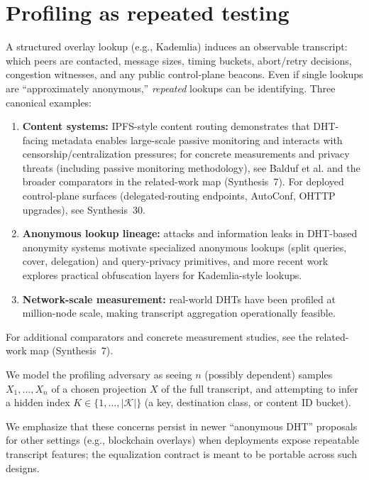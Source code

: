 \documentclass[11pt]{article}
\begin{document}
\section{Profiling as repeated testing}
A structured overlay lookup (e.g., Kademlia\cite{kademlia}) induces an observable transcript: which peers are contacted, message sizes, timing buckets, abort/retry decisions, congestion witnesses, and any public control-plane beacons.
Even if single lookups are ``approximately anonymous,'' \emph{repeated} lookups can be identifying.
Three canonical examples:
\begin{enumerate}[leftmargin=*]
\item \textbf{Content systems:} IPFS-style content routing demonstrates that DHT-facing metadata enables large-scale passive monitoring and interacts with censorship/centralization pressures; for concrete measurements and privacy threats (including passive monitoring methodology), see Balduf et al.\cite{baldufIPFSMonitoring2022} and the broader comparators in the related-work map (Synthesis~7).\cite{trautweinIPFS2022,series:relatedworkmap} For deployed control-plane surfaces (delegated-routing endpoints, AutoConf, OHTTP upgrades), see Synthesis~30.\cite{series:deployedsurfaces}
\item \textbf{Anonymous lookup lineage:} attacks and information leaks in DHT-based anonymity systems motivate specialized anonymous lookups (split queries, cover, delegation) and query-privacy primitives, and more recent work explores practical obfuscation layers for Kademlia-style lookups.\cite{wangborisovLookupCCS2010,mittal_tissec,octopus,backesQueryPrivacy2012,danielQueryObfuscationSAC2025}
\item \textbf{Network-scale measurement:} real-world DHTs have been profiled at million-node scale, making transcript aggregation operationally feasible.\cite{falknerMillionDHT2007}
\end{enumerate}

For additional comparators and concrete measurement studies, see the related-work map (Synthesis~7).\cite{series:relatedworkmap}

We model the profiling adversary as seeing $n$ (possibly dependent) samples $X_1,\dots,X_n$ of a chosen projection $X$ of the full transcript, and attempting to infer a hidden index $K\in\{1,\dots,|\mathcal K|\}$ (a key, destination class, or content ID bucket).

We emphasize that these concerns persist in newer ``anonymous DHT'' proposals for other settings (e.g., blockchain overlays) when deployments expose repeatable transcript features; the equalization contract is meant to be portable across such designs.\cite{tsengNCDHT2024}
\end{document}
